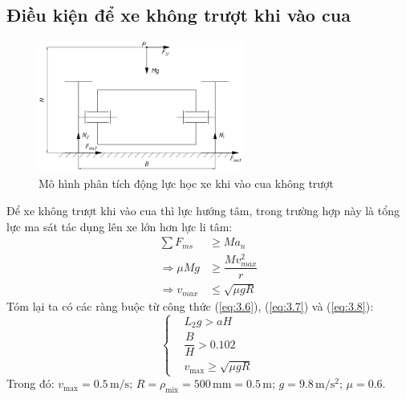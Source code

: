         \subsection{Điều kiện để xe không trượt khi vào cua}
            \begin{figure}[H]
                \centering
                \includegraphics[width=0.6\textwidth]{pictures/chapter3/c3_p3_TurningAnalysis2.png}
                \caption{Mô hình phân tích động lực học xe khi vào cua không trượt}
                \label{fig:3.3}
            \end{figure}
            \hspace*{0.6cm}Để xe không trượt khi vào cua thì lực hướng tâm, trong trường hợp này là tổng lực ma sát tác dụng lên xe lớn hơn lực li tâm:
            \begin{align}
                \sum F_{ms} &\geq Ma_n \label{eq:3.6} \\
                \Rightarrow \mu Mg &\geq \dfrac{Mv_{max}^2}{r} \label{eq:3.7} \\
                \Rightarrow v_{max} &\leq \sqrt{\mu gR} \label{eq:3.8}
            \end{align}
            \hspace*{0.6cm}Tóm lại ta có các ràng buộc từ công thức (\ref{eq:3.6}), (\ref{eq:3.7}) và (\ref{eq:3.8}):
            \begin{equation}
                \begin{cases}
                    &L_2 g > aH \\
                    &\dfrac{B}{H} > 0.102 \\
                    &v_{\text{max}} \geq \sqrt{\mu g R}
                \end{cases}
                \label{eq:3.9}
            \end{equation}
            \hspace*{0.6cm}Trong đó: $v_{\text{max}} = 0.5 \,\mathrm{m/s}; \, R = \rho_{\text{mix}} = 500 \,\mathrm{mm} = 0.5 \,\mathrm{m}; \, g = 9.8 \,\mathrm{m/s^2}; \, \mu = 0.6$.\\
